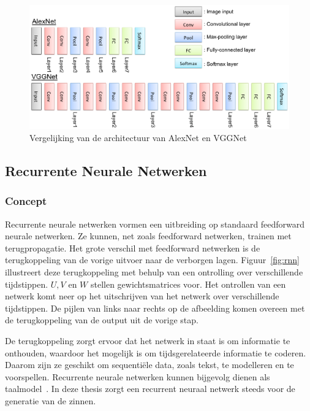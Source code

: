 \begin{figure}[tb]
	\centering
	\includegraphics[width=\linewidth]{Images/alex_vgg.eps}
	\caption[Vergelijking van de architectuur van AlexNet en VGGNet]{Vergelijking van de architectuur van AlexNet en VGGNet~\cite{Kataoka}}
	\label{fig:alexvgg}
\end{figure}

\subsection{Recurrente Neurale Netwerken}
\subsubsection{Concept}
\label{sec:rnnconcept}
Recurrente neurale netwerken vormen een uitbreiding op standaard feedforward neurale netwerken. Ze kunnen, net zoals feedforward netwerken, trainen met terugpropagatie. Het grote verschil met feedforward netwerken is de terugkoppeling van de vorige uitvoer naar de verborgen lagen. Figuur~\ref{fig:rnn} illustreert deze terugkoppeling met behulp van een ontrolling over verschillende tijdstippen. $U,V$ en $W$ stellen gewichtsmatrices voor. Het ontrollen van een netwerk komt neer op het uitschrijven van het netwerk over verschillende tijdstippen. De pijlen van links naar rechts op de afbeelding komen overeen met de terugkoppeling van de output uit de vorige stap.

De terugkoppeling zorgt ervoor dat het netwerk in staat is om informatie te onthouden, waardoor het mogelijk is om tijdsgerelateerde informatie te coderen. Daarom zijn ze geschikt om sequenti\"ele data, zoals tekst, te modelleren en te voorspellen. Recurrente neurale netwerken kunnen bijgevolg dienen als taalmodel~\cite{Mikolov2010}. In deze thesis zorgt een recurrent neuraal netwerk steeds voor de generatie van de zinnen.

